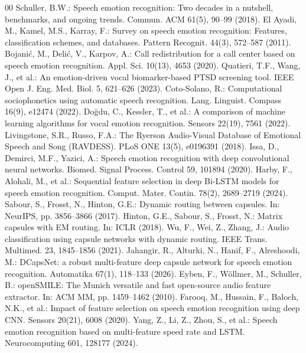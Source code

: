 \documentclass[twocolumn]{article}
\begin{document}
\begin{thebibliography}{00}
 Schuller, B.W.: Speech emotion recognition: Two decades in a nutshell, benchmarks, and ongoing trends. Commun. ACM 61(5), 90--99 (2018).
 El Ayadi, M., Kamel, M.S., Karray, F.: Survey on speech emotion recognition: Features, classification schemes, and databases. Pattern Recognit. 44(3), 572--587 (2011).
 Bojanić, M., Delić, V., Karpov, A.: Call redistribution for a call center based on speech emotion recognition. Appl. Sci. 10(13), 4653 (2020).
 Quatieri, T.F., Wang, J., et al.: An emotion-driven vocal biomarker-based PTSD screening tool. IEEE Open J. Eng. Med. Biol. 5, 621--626 (2023).
 Coto-Solano, R.: Computational sociophonetics using automatic speech recognition. Lang. Linguist. Compass 16(9), e12474 (2022).
 Doğdu, C., Kessler, T., et al.: A comparison of machine learning algorithms for vocal emotion recognition. Sensors 22(19), 7561 (2022).
 Livingstone, S.R., Russo, F.A.: The Ryerson Audio-Visual Database of Emotional Speech and Song (RAVDESS). PLoS ONE 13(5), e0196391 (2018).
 Issa, D., Demirci, M.F., Yazici, A.: Speech emotion recognition with deep convolutional neural networks. Biomed. Signal Process. Control 59, 101894 (2020).
 Harby, F., Alohali, M., et al.: Sequential feature selection in deep Bi-LSTM models for speech emotion recognition. Comput. Mater. Contin. 78(2), 2689--2719 (2024).
 Sabour, S., Frosst, N., Hinton, G.E.: Dynamic routing between capsules. In: NeurIPS, pp. 3856--3866 (2017).
 Hinton, G.E., Sabour, S., Frosst, N.: Matrix capsules with EM routing. In: ICLR (2018).
 Wu, F., Wei, Z., Zhang, J.: Audio classification using capsule networks with dynamic routing. IEEE Trans. Multimed. 23, 1845--1856 (2021).
 Jahangir, R., Alturki, N., Hanif, F., Alreshoodi, M.: DCapsNet: a robust multi-feature deep capsule network for speech emotion recognition. Automatika 67(1), 118--133 (2026).
 Eyben, F., Wöllmer, M., Schuller, B.: openSMILE: The Munich versatile and fast open-source audio feature extractor. In: ACM MM, pp. 1459--1462 (2010).
 Farooq, M., Hussain, F., Baloch, N.K., et al.: Impact of feature selection on speech emotion recognition using deep CNN. Sensors 20(21), 6008 (2020).
 Yang, Z., Li, Z., Zhou, S., et al.: Speech emotion recognition based on multi-feature speed rate and LSTM. Neurocomputing 601, 128177 (2024).

\end{thebibliography}
\end{document}
